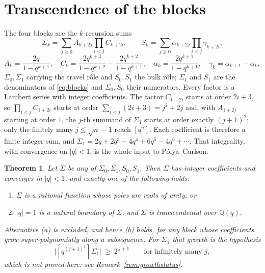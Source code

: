 \documentclass[11pt]{article}
\theoremstyle{plain}
\newtheorem{theorem}{Theorem}
\theoremstyle{definition}
\theoremstyle{remark}
\newcommand{\Q}{\mathbb{Q}}
\begin{document}
\section{Transcendence of the blocks}\label{sec:blocks}

The four blocks are the $k$-recursion sums
\begin{equation}\label{eq:krec}
  \Sigma_k=\sum_{j\ge0}A_{k+2j}\prod_{i<j}C_{k+2i},\qquad
  S_k=\sum_{j\ge0}\alpha_{k+2j}\prod_{i<j}\gamma_{k+2i},
\end{equation}
\[
  A_k=\frac{2q}{1-q^{k+1}},\quad
  C_k=\frac{2q^{k+3}}{1-q^{k+2}}-\frac{2q^{k+2}}{1-q^{k+1}},\quad
  \alpha_k=\frac{2q^{k+1}}{1-q^{k+1}},\quad
  \gamma_k=\alpha_{k+1}-\alpha_k ,
\]
$\Sigma_0,\Sigma_1$ carrying the travel r\^ole and $S_0,S_1$ the bulk r\^ole; $\Sigma_1$ and $S_1$
are the denominators of \eqref{eq:blocks} and $\Sigma_0,S_0$ their numerators. Every factor is a
Lambert series with integer coefficients. The factor $C_{1+2i}$ starts at order $2i+3$, so
$\prod_{i<j}C_{1+2i}$ starts at order $\sum_{i<j}(2i+3)=j^2+2j$ and, with $A_{1+2j}$ starting at
order $1$, the $j$-th summand of $\Sigma_1$ starts at order exactly $(j+1)^2$; only the finitely
many $j\le\sqrt n-1$ reach $[q^n]$. Each coefficient is therefore a finite integer sum, and
$\Sigma_1=2q+2q^3-4q^4+6q^5-4q^6+\cdots$. That integrality, with convergence on $|q|<1$, is the
whole input to P\'olya--Carlson.

\begin{theorem}\label{thm:blocks}
Let $\Sigma$ be any of $\Sigma_0,\Sigma_1,S_0,S_1$. Then $\Sigma$ has integer coefficients and
converges in $|q|<1$, and exactly one of the following holds:
\begin{enumerate}[label=\textup{(\alph*)},leftmargin=2.2em,itemsep=0.1em,topsep=0.2em]
\item $\Sigma$ is a rational function whose poles are roots of unity; or
\item $|q|=1$ is a natural boundary of $\Sigma$, and $\Sigma$ is transcendental over $\Q(q)$.
\end{enumerate}
Alternative \textup{(a)} is excluded, and hence \textup{(b)} holds, for any block whose
coefficients grow super-polynomially along a subsequence. For $\Sigma_1$ that growth is the
hypothesis
\begin{equation}\label{eq:growth}
   \bigl|[q^{(j+1)^2}]\Sigma_1\bigr|\ \ge\ 2^{\,j+1}\qquad\text{for infinitely many }j,
\end{equation}
which is \emph{not proved here}: see Remark~\textup{\ref{rem:growthstatus}}.
\end{theorem}
\end{document}
